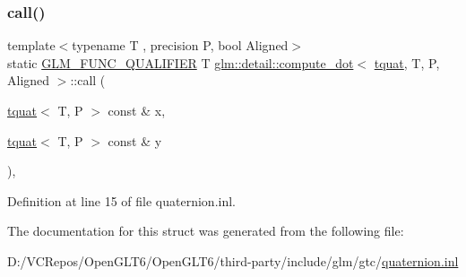 \subsubsection{\texorpdfstring{call()}{call()}}
{\footnotesize\ttfamily template$<$typename T , precision P, bool Aligned$>$ \\
static \mbox{\hyperlink{setup_8hpp_a33fdea6f91c5f834105f7415e2a64407}{G\+L\+M\+\_\+\+F\+U\+N\+C\+\_\+\+Q\+U\+A\+L\+I\+F\+I\+ER}} T \mbox{\hyperlink{structglm_1_1detail_1_1compute__dot}{glm\+::detail\+::compute\+\_\+dot}}$<$ \mbox{\hyperlink{structglm_1_1tquat}{tquat}}, T, P, Aligned $>$\+::call (\begin{DoxyParamCaption}\item[{\mbox{\hyperlink{structglm_1_1tquat}{tquat}}$<$ T, P $>$ const \&}]{x,  }\item[{\mbox{\hyperlink{structglm_1_1tquat}{tquat}}$<$ T, P $>$ const \&}]{y }\end{DoxyParamCaption})\hspace{0.3cm}{\ttfamily [inline]}, {\ttfamily [static]}}



Definition at line 15 of file quaternion.\+inl.



The documentation for this struct was generated from the following file\+:\begin{DoxyCompactItemize}
\item 
D\+:/\+V\+C\+Repos/\+Open\+G\+L\+T6/\+Open\+G\+L\+T6/third-\/party/include/glm/gtc/\mbox{\hyperlink{gtc_2quaternion_8inl}{quaternion.\+inl}}\end{DoxyCompactItemize}
